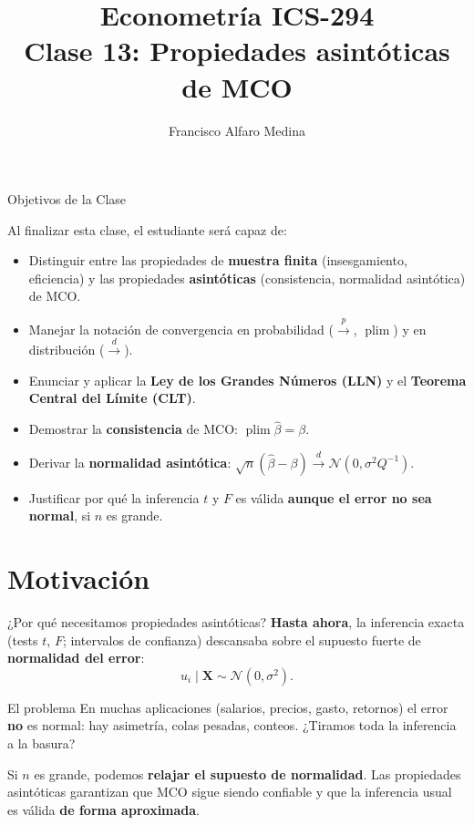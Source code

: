 \documentclass{beamer}
\title[ICS-294]{Econometría ICS-294\\ \small{Clase 13: Propiedades asintóticas de MCO}}
\author{Francisco Alfaro Medina}
\institute[USM]
{Universidad Técnica Federico Santa María\\ %
	\medskip
	\textit{francisco.alfaro@usm.cl} %

}
\date{}
\DeclareMathOperator*{\plim}{plim}
\begin{document}
\begin{frame}
	\titlepage %


\end{frame}
\logo{}


\begin{frame}{Objetivos de la Clase}

Al finalizar esta clase, el estudiante será capaz de:

\begin{itemize}
    \item[\checkmark] Distinguir entre las propiedades de \textbf{muestra finita} (insesgamiento, eficiencia) y las propiedades \textbf{asintóticas} (consistencia, normalidad asintótica) de MCO.
    \item[\checkmark] Manejar la notación de convergencia en probabilidad ($\overset{p}{\to}$, $\plim$) y en distribución ($\overset{d}{\to}$).
    \item[\checkmark] Enunciar y aplicar la \textbf{Ley de los Grandes Números (LLN)} y el \textbf{Teorema Central del Límite (CLT)}.
    \item[\checkmark] Demostrar la \textbf{consistencia} de MCO: $\plim\hat{\beta} = \beta$.
    \item[\checkmark] Derivar la \textbf{normalidad asintótica}: $\sqrt{n}(\hat{\beta}-\beta) \overset{d}{\to} \mathcal{N}(0,\sigma^2 Q^{-1})$.
    \item[\checkmark] Justificar por qué la inferencia $t$ y $F$ es válida \textbf{aunque el error no sea normal}, si $n$ es grande.
\end{itemize}

\end{frame}

\section{Motivación}

\begin{frame}{¿Por qué necesitamos propiedades asintóticas?}
    \textbf{Hasta ahora}, la inferencia exacta (tests $t$, $F$; intervalos de confianza) descansaba sobre el supuesto fuerte de \textbf{normalidad del error}:
    \[
    u_i \mid \mathbf{X} \sim \mathcal{N}(0,\sigma^2).
    \]
    \pause
    \begin{alertblock}{El problema}
    En muchas aplicaciones (salarios, precios, gasto, retornos) el error \textbf{no} es normal: hay asimetría, colas pesadas, conteos. ¿Tiramos toda la inferencia a la basura?
    \end{alertblock}
    \pause
    \begin{tcolorbox}[colback=green!5!white, colframe=green!55!black, title=La salida: muestras grandes]
    Si $n$ es grande, podemos \textbf{relajar el supuesto de normalidad}. Las propiedades asintóticas garantizan que MCO sigue siendo confiable y que la inferencia usual es válida \textbf{de forma aproximada}.
    \end{tcolorbox}
\end{frame}
\end{document}
